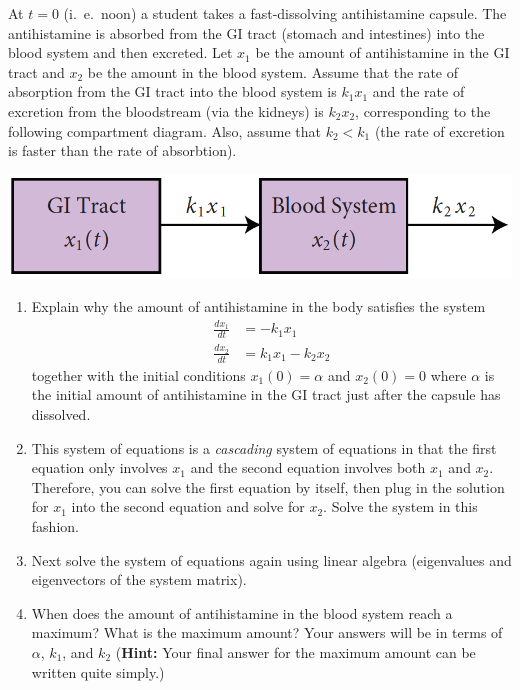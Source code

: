 \documentclass[12pt,letterpaper]{hmcpset}
\begin{document}
\begin{problem}[5]
    At $t=0$ (i.~e.~noon) a student takes a fast-dissolving
    antihistamine capsule. The antihistamine is absorbed from the GI
    tract (stomach and intestines) into the blood system and then
    excreted. Let $x_1$ be the amount of antihistamine in the GI tract
    and $x_2$ be the amount in the blood system. Assume that the rate
    of absorption from the GI tract into the blood system is $k_1x_1$
    and the rate of excretion from the bloodstream (via the kidneys)
    is $k_2x_2$, corresponding to the following compartment diagram.
    Also, assume that $k_2<k_1$ (the rate of excretion is faster than
    the rate of absorbtion).
    \begin{center}
        \includegraphics[scale=0.7]{img/may_24_5}
    \end{center}
    \begin{enumerate}
        \item Explain why the amount of antihistamine in the body
            satisfies the system
            \begin{align*}
                \frac{dx_1}{dt}&=-k_1x_1\\
                \frac{dx_2}{dt}&=k_1x_1-k_2x_2
            \end{align*}
            together with the initial conditions $x_1(0)=\alpha$ and
            $x_2(0)=0$ where $\alpha$ is the initial amount of
            antihistamine in the GI tract just after the capsule has
            dissolved.
        \item This system of equations is a \textit{cascading} system
            of equations in that the first equation only involves $x_1$
            and the second equation involves both $x_1$ and
            $x_2$. Therefore, you can solve the first equation by
            itself, then plug in the solution for $x_1$ into the second
            equation and solve for $x_2$. Solve the system in this
            fashion.
        \item Next solve the system of equations again using linear
            algebra (eigenvalues and eigenvectors of the system matrix).
        \item When does the amount of antihistamine in the blood
            system reach a maximum? What is the maximum amount? Your
            answers will be in terms of $\alpha$, $k_1$, and $k_2$
            (\textbf{Hint:} Your final answer for the maximum amount can
            be written quite simply.)
    \end{enumerate}
\end{problem}
\newpage
\begin{solution}
    \null\vfill
\end{solution}
\newpage
\end{document}
